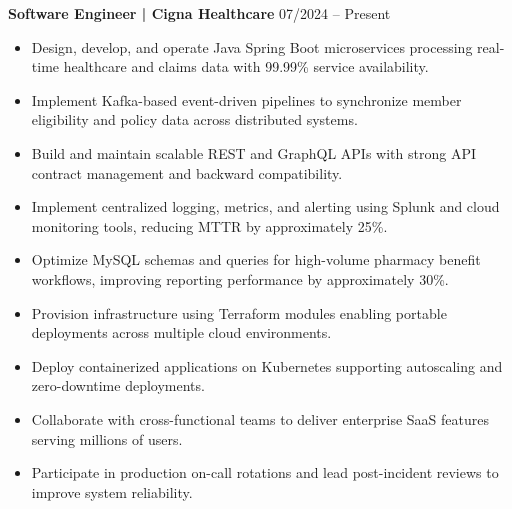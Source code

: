 \documentclass[10pt,letterpaper]{article}
\begin{document}
\textbf{Software Engineer  | Cigna Healthcare} \hfill 07/2024 -- Present\\
\vspace{-12pt}
\begin{itemize}
\item Design, develop, and operate Java Spring Boot microservices processing real-time healthcare and claims data with 99.99\% service availability.
\item Implement Kafka-based event-driven pipelines to synchronize member eligibility and policy data across distributed systems.
\item Build and maintain scalable REST and GraphQL APIs with strong API contract management and backward compatibility.
\item Implement centralized logging, metrics, and alerting using Splunk and cloud monitoring tools, reducing MTTR by approximately 25\%.
\item Optimize MySQL schemas and queries for high-volume pharmacy benefit workflows, improving reporting performance by approximately 30\%.
\item Provision infrastructure using Terraform modules enabling portable deployments across multiple cloud environments.
\item Deploy containerized applications on Kubernetes supporting autoscaling and zero-downtime deployments.
\item Collaborate with cross-functional teams to deliver enterprise SaaS features serving millions of users.
\item Participate in production on-call rotations and lead post-incident reviews to improve system reliability.
\end{itemize}
\end{document}
